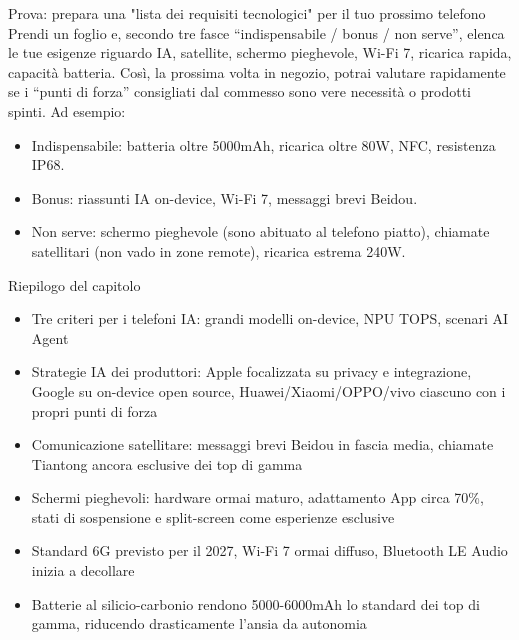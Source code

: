 \begin{tcbpractice}{Prova: prepara una "lista dei requisiti tecnologici" per il tuo prossimo telefono}
Prendi un foglio e, secondo tre fasce “indispensabile / bonus / non serve”, elenca le tue esigenze riguardo IA, satellite, schermo pieghevole, Wi-Fi 7, ricarica rapida, capacità batteria. Così, la prossima volta in negozio, potrai valutare rapidamente se i “punti di forza” consigliati dal commesso sono vere necessità o prodotti spinti. Ad esempio:

\begin{itemize}
  \item Indispensabile: batteria oltre 5000mAh, ricarica oltre 80W, NFC, resistenza IP68.
  \item Bonus: riassunti IA on-device, Wi-Fi 7, messaggi brevi Beidou.
  \item Non serve: schermo pieghevole (sono abituato al telefono piatto), chiamate satellitari (non vado in zone remote), ricarica estrema 240W.
\end{itemize}

\end{tcbpractice}

\begin{tcbsummary}{Riepilogo del capitolo}
\begin{itemize}
  \item Tre criteri per i telefoni IA: grandi modelli on-device, NPU TOPS, scenari AI Agent
  \item Strategie IA dei produttori: Apple focalizzata su privacy e integrazione, Google su on-device open source, Huawei/Xiaomi/OPPO/vivo ciascuno con i propri punti di forza
  \item Comunicazione satellitare: messaggi brevi Beidou in fascia media, chiamate Tiantong ancora esclusive dei top di gamma
  \item Schermi pieghevoli: hardware ormai maturo, adattamento App circa 70\%, stati di sospensione e split-screen come esperienze esclusive
  \item Standard 6G previsto per il 2027, Wi-Fi 7 ormai diffuso, Bluetooth LE Audio inizia a decollare
  \item Batterie al silicio-carbonio rendono 5000-6000mAh lo standard dei top di gamma, riducendo drasticamente l'ansia da autonomia
\end{itemize}

\end{tcbsummary}
